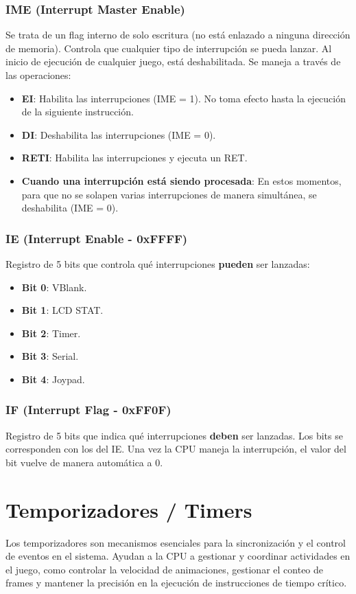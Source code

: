 \subsubsection{IME (Interrupt Master Enable)}
Se trata de un flag interno de solo escritura (no está enlazado a ninguna dirección de memoria). Controla que cualquier tipo de interrupción se pueda lanzar. Al inicio de ejecución de cualquier juego, está deshabilitada. Se maneja a través de las operaciones:
\begin{itemize}
    \item \textbf{EI}: Habilita las interrupciones (IME = 1). No toma efecto hasta la ejecución de la siguiente instrucción.
    \item \textbf{DI}: Deshabilita las interrupciones (IME = 0).
    \item \textbf{RETI}: Habilita las interrupciones y ejecuta un RET.
    \item \textbf{Cuando una interrupción está siendo procesada}: En estos momentos, para que no se solapen varias interrupciones de manera simultánea, se deshabilita (IME = 0).
\end{itemize}

\subsubsection{IE (Interrupt Enable - 0xFFFF)}
Registro de 5 bits que controla qué interrupciones \textbf{pueden} ser lanzadas:
\begin{itemize}
    \item \textbf{Bit 0}: VBlank.
    \item \textbf{Bit 1}: LCD STAT.
    \item \textbf{Bit 2}: Timer.
    \item \textbf{Bit 3}: Serial.
    \item \textbf{Bit 4}: Joypad.
\end{itemize}

\subsubsection{IF (Interrupt Flag - 0xFF0F)}
Registro de 5 bits que indica qué interrupciones \textbf{deben} ser lanzadas. Los bits se corresponden con los del IE.
Una vez la CPU maneja la interrupción, el valor del bit vuelve de manera automática a 0.

\section{Temporizadores / Timers}
\label{history_timer}
Los temporizadores son mecanismos esenciales para la sincronización y el control de eventos en el sistema. Ayudan a la CPU a gestionar y coordinar actividades en el juego, como controlar la velocidad de animaciones, gestionar el conteo de frames y mantener la precisión en la ejecución de instrucciones de tiempo crítico.


